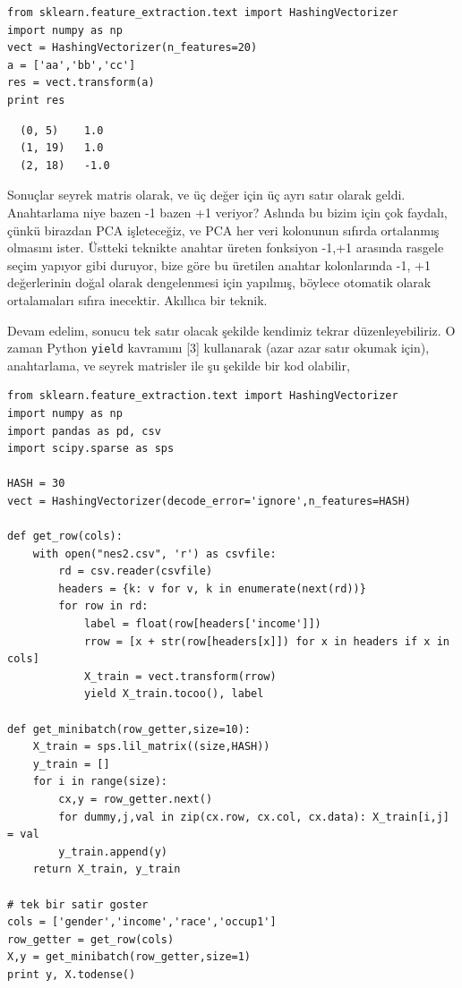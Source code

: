 \documentclass[12pt,fleqn]{article}\usepackage{../../common}
\begin{document}
\begin{verbatim}
from sklearn.feature_extraction.text import HashingVectorizer
import numpy as np
vect = HashingVectorizer(n_features=20)
a = ['aa','bb','cc']
res = vect.transform(a)
print res
\end{verbatim}

\begin{verbatim}
  (0, 5)	1.0
  (1, 19)	1.0
  (2, 18)	-1.0
\end{verbatim}

Sonuçlar seyrek matris olarak, ve üç değer için üç ayrı satır olarak
geldi. Anahtarlama niye bazen -1 bazen +1 veriyor? Aslında bu bizim için
çok faydalı, çünkü birazdan PCA işleteceğiz, ve PCA her veri kolonunun
sıfırda ortalanmış olmasını ister. Üstteki teknikte anahtar üreten
fonksiyon -1,+1 arasında rasgele seçim yapıyor gibi duruyor, bize göre bu
üretilen anahtar kolonlarında -1, +1 değerlerinin doğal olarak dengelenmesi
için yapılmış, böylece otomatik olarak ortalamaları sıfıra
inecektir. Akıllıca bir teknik.

Devam edelim, sonucu tek satır olacak şekilde kendimiz tekrar
düzenleyebiliriz. O zaman Python \verb!yield! kavramını [3] kullanarak
(azar azar satır okumak için), anahtarlama, ve seyrek matrisler ile şu
şekilde bir kod olabilir,

\begin{verbatim}
from sklearn.feature_extraction.text import HashingVectorizer
import numpy as np
import pandas as pd, csv
import scipy.sparse as sps

HASH = 30
vect = HashingVectorizer(decode_error='ignore',n_features=HASH)

def get_row(cols):
    with open("nes2.csv", 'r') as csvfile:
        rd = csv.reader(csvfile)
        headers = {k: v for v, k in enumerate(next(rd))}
        for row in rd:
            label = float(row[headers['income']])
            rrow = [x + str(row[headers[x]]) for x in headers if x in cols]
            X_train = vect.transform(rrow)
            yield X_train.tocoo(), label            

def get_minibatch(row_getter,size=10):
    X_train = sps.lil_matrix((size,HASH))
    y_train = []
    for i in range(size):
        cx,y = row_getter.next()
        for dummy,j,val in zip(cx.row, cx.col, cx.data): X_train[i,j] = val
        y_train.append(y)
    return X_train, y_train

# tek bir satir goster    
cols = ['gender','income','race','occup1']
row_getter = get_row(cols)
X,y = get_minibatch(row_getter,size=1)
print y, X.todense()
\end{verbatim}
\end{document}
